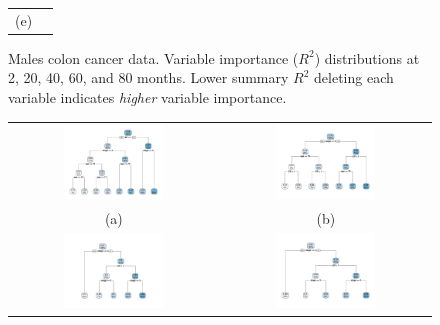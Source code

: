 \documentclass[12pt]{article}
\begin{document}
\begin{figure}
\begin{tabular}{cc}
   (e) 
\end{tabular}
\caption{ Males colon cancer data. Variable importance ($R^2$) distributions at 2, 20, 40, 60, and 80 months. Lower summary $R^2$ deleting each variable indicates \emph{higher} variable importance.\label{fig:vimp_males}}
\end{figure}


\begin{figure}
\centering
\begin{tabular}{cc}
   \includegraphics[width=0.5\textwidth]{rpart1_males.pdf}  &
   \includegraphics[width=0.5\textwidth]{rpart10_males.pdf} \\
   (a) & (b) \\
   \includegraphics[width=0.5\textwidth]{rpart20_males.pdf} & 
   \includegraphics[width=0.5\textwidth]{rpart30_males.pdf} \\

\end{tabular}
\end{figure}
\end{document}

